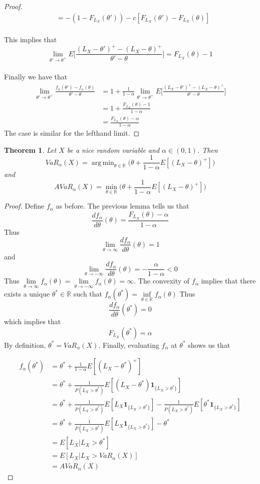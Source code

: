 \documentclass[12pt]{amsart}
\newtheorem{thm}{Theorem}[section]
\newcommand{\al}{\alpha}
\newcommand{\R}{\mathbb{R}}
\DeclareMathOperator*{\argmin}{arg\,min}
\begin{document}
\begin{proof}
\begin{align*}
&= -(1-F_{L_X}(\theta')) -c[F_{L_X}(\theta') - F_{L_X}(\theta)]
\end{align*}\\
This implies that $$\lim_{\theta' \rightarrow \theta^+}E\bigg[ \frac{(L_X - \theta')^+ - (L_X - \theta)^+}{\theta'-\theta} \bigg] = F_{L_X}(\theta) -1$$\\
Finally we have that 
\begin{align*}
\lim_{\theta' \rightarrow \theta^+} \frac{f_\al(\theta') - f_\al(\theta)}{\theta' - \theta} 
&= 1 + \frac{1}{1-\al}\lim_{\theta' \rightarrow \theta^+}E\bigg[ \frac{(L_X - \theta')^+ - (L_X - \theta)^+}{\theta'-\theta} \bigg] \\
&= 1 + \frac{F_{L_X}(\theta) -1}{1-\al}\\
&= \frac{F_{L_X}(\theta) -\al}{1-\al}
\end{align*}
The case is similar for the lefthand limit.

\end{proof}

\begin{thm}
Let $X$ be a nice random variable and $\al\in (0,1)$. Then $$VaR_{\al}(X) = \argmin_{\theta \in \R} \bigg(\theta + \frac{1}{1-\al}E[(L_X - \theta)^+]\bigg)$$ and $$AVaR_{\al}(X) = \min_{\theta \in \R} \bigg(\theta + \frac{1}{1-\al}E[(L_X - \theta)^+]\bigg)$$
\end{thm}

\begin{proof} 
Define $f_{\alpha}$ as before. The previous lemma tells us that $$\frac{d f_{\al}}{d \theta}(\theta) = \frac{F_{L_X}(\theta) -\al}{1-\al} $$ Thus $$\lim_{\theta \rightarrow \infty}\frac{d f_{\al}}{d \theta}(\theta) = 1$$ and $$\lim_{\theta \rightarrow -\infty} \frac{d f_{\al}}{d \theta}(\theta) = - \frac{\al}{1-\al} <0$$
Thus $\lim\limits_{\theta \rightarrow \infty} f_{\alpha}(\theta) = \lim\limits_{\theta \rightarrow -\infty}f_{\al}(\theta) = \infty$. The convexity of $f_{\al}$ implies that there exists a unique $\theta^* \in \R$ such that $f_{\al}(\theta^*) = \inf\limits_{\theta \in \R}f_{\al}(\theta)$
Thus $$\frac{d f_{\al}}{d \theta}(\theta^*) = 0$$
which implies that $$F_{L_X}(\theta^*) = \al$$
By definition, $\theta^* = VaR_{\al}(X)$. Finally, evaluating $f_{\al}$ at $\theta^*$ shows us that 

\begin{align*}
f_{\al}(\theta^*)  
&=  \theta^* + \frac{1}{1- \al}E[(L_X - \theta^*)^+]\\
& = \theta^* + \frac{1}{P(L_X>\theta^*)}E[(L_X-\theta^*)\mathbf{1}_{\{L_X>\theta^*\}}] \\
& = \theta^* + \frac{1}{P(L_X>\theta^*)}E[L_X\mathbf{1}_{\{L_X>\theta^*\}}] - \frac{1}{P(L_X>\theta^*)}E[\theta^*\mathbf{1}_{\{L_X>\theta^*\}}] \\
& = \theta^* + \frac{1}{P(L_X>\theta^*)}E[L_X\mathbf{1}_{\{L_X>\theta^*\}}] - \theta^* \\
&= E[L_X|L_X> \theta^*] \\
& = E[L_X|L_X>VaR_{\al}(X)] \\
& = AVaR_{\al}(X)
\end{align*}

\end{proof}
\end{document}
